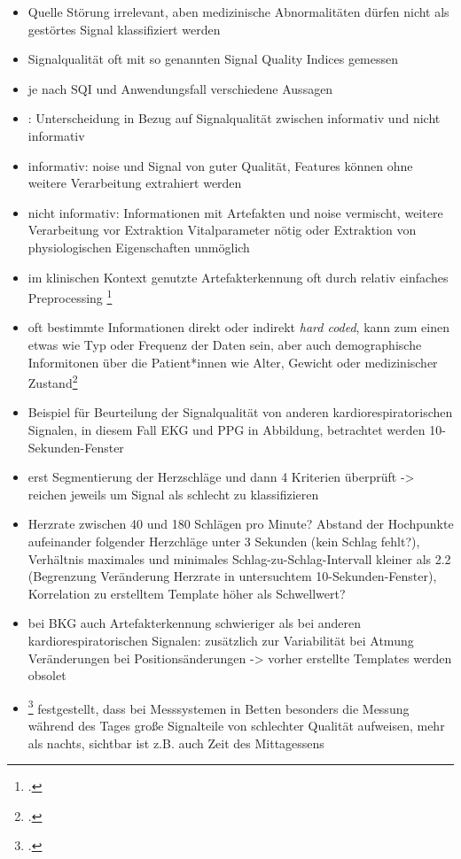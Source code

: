 	\begin{itemize}
		\item Quelle Störung irrelevant, aben medizinische Abnormalitäten dürfen nicht als gestörtes Signal klassifiziert werden
		\item Signalqualität oft mit so genannten Signal Quality Indices gemessen
		\item je nach SQI und Anwendungsfall verschiedene Aussagen
		\item \citeauthor{Sadek2016}: Unterscheidung in Bezug auf Signalqualität zwischen informativ und nicht informativ
		\item informativ: noise und Signal von guter Qualität, Features können ohne weitere Verarbeitung extrahiert werden
		\item nicht informativ: Informationen mit Artefakten und noise vermischt, weitere Verarbeitung vor Extraktion Vitalparameter nötig oder Extraktion von physiologischen Eigenschaften unmöglich
		\item im klinischen Kontext genutzte Artefakterkennung oft durch relativ einfaches Preprocessing \footcite[Vgl.][]{Nizami2013}
		\item oft bestimmte Informationen direkt oder indirekt \textit{hard coded}, kann zum einen etwas wie Typ oder Frequenz der Daten sein, aber auch demographische Informitonen über die Patient*innen wie Alter, Gewicht oder medizinischer Zustand\footcite[Vgl.][]{Nizami2013}
		\item Beispiel für Beurteilung der Signalqualität von anderen kardiorespiratorischen Signalen, in diesem Fall \ac{EKG} und \ac{PPG} in Abbildung, betrachtet werden 10-Sekunden-Fenster %
		\item erst Segmentierung der Herzschläge und dann 4 Kriterien überprüft -> reichen jeweils um Signal als schlecht zu klassifizieren
		\item Herzrate zwischen 40 und 180 Schlägen pro Minute? Abstand der Hochpunkte aufeinander folgender Herzchläge unter 3 Sekunden (kein Schlag fehlt?), Verhältnis maximales und minimales Schlag-zu-Schlag-Intervall kleiner als 2.2 (Begrenzung Veränderung Herzrate in untersuchtem 10-Sekunden-Fenster), Korrelation zu erstelltem Template höher als Schwellwert?
		\item bei \ac{BKG} auch Artefakterkennung schwieriger als bei anderen kardiorespiratorischen Signalen: zusätzlich zur Variabilität bei Atmung Veränderungen bei Positionsänderungen -> vorher erstellte Templates werden obsolet
		\item \footcite{HoogAntink2020} festgestellt, dass bei Messsystemen in Betten besonders die Messung während des Tages große Signalteile von schlechter Qualität aufweisen, mehr als nachts, sichtbar ist z.B. auch Zeit des Mittagessens

\end{itemize}
